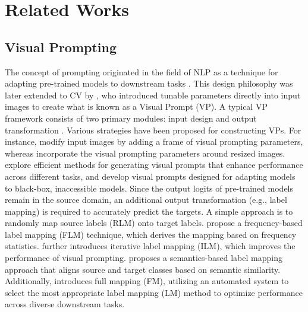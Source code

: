 \section{Related Works}
\subsection{Visual Prompting}
The concept of prompting originated in the field of NLP as a technique for adapting pre-trained models to downstream tasks \citep{shin-etal-2020-autoprompt, liu2022few, li2021prefix, liu2023pre, han2023svdiff, han2024proxedit, jin2023visual}. This design philosophy was later extended to CV by \citet{bahng2022exploring}, who introduced tunable parameters directly into input images
 to create what is known as a Visual Prompt (VP). 
A typical VP framework consists of two primary modules: input design and output transformation \citep{bahng2022exploring, tsai2020reprogramming, tsao2024autovp,caisample}. 
Various strategies have been proposed for constructing VPs.
For instance, \citet{bahng2022exploring} modify input images by adding a frame of visual prompting parameters, whereas \citet{chen2023understanding} incorporate the visual prompting parameters around resized images. \citet{wu2022learning} 
explore efficient methods for generating visual prompts that enhance performance across different tasks, and \citet{Oh_2023_CVPR} develop visual prompts designed for adapting models to black-box, inaccessible models. Since the output logits of pre-trained models remain in the source domain, an additional output transformation (e.g., label mapping) is required to accurately predict the targets. A simple approach is to randomly map source labels (RLM) onto target labels. \citet{tsai2020reprogramming} propose a frequency-based label mapping (FLM) technique, which derives the mapping based on frequency statistics. \citet{chen2023understanding} further introduces iterative label mapping (ILM), which improves the performance of visual prompting. \citet{yang-etal-2023-prompt} proposes a semantics-based label mapping approach that aligns source and target classes based on semantic similarity. Additionally, \citet{tsao2024autovp} introduces full mapping (FM), utilizing an automated system to select the most appropriate label mapping (LM) method to optimize performance across diverse downstream tasks.

